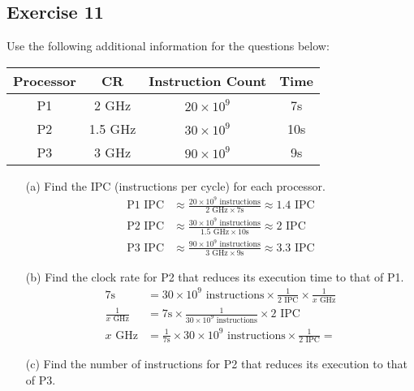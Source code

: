 \documentclass[12pt]{article}
\begin{document}
\subsection*{Exercise 11} Use the following additional information for the questions below:
\begin{center}
\begin{tabular}{| c | c | c | c |}
\hline
Processor & CR & Instruction Count & Time \\
\hline
P1 & 2 GHz & $20 \times 10^9$ & 7s \\
\hline
P2 & 1.5 GHz & $30 \times 10^9$ & 10s \\
\hline
P3 & 3 GHz & $90 \times 10^9$ & 9s \\
\hline
\end{tabular}
\end{center}
\begin{itemize}
\item[(a)] Find the IPC (instructions per cycle) for each processor.
\begin{align*}
\text{P1 IPC} &\approx \frac{20 \times 10^9 \text{ instructions}}{2 \text{ GHz} \times 7\text{s}} \approx 1.4 \text{ IPC} \\
\text{P2 IPC} &\approx \frac{30 \times 10^9 \text{ instructions}}{1.5 \text{ GHz} \times 10\text{s}} \approx 2 \text{ IPC} \\
\text{P3 IPC} &\approx \frac{90 \times 10^9 \text{ instructions}}{3 \text{ GHz} \times 9\text{s}} \approx 3.3 \text{ IPC}
\end{align*}
\item[(b)] Find the clock rate for P2 that reduces its execution time to that of P1.
\begin{align*}
7\text{s} &= 30 \times 10^9 \text{ instructions} \times \frac{1}{2\text{ IPC}} \times \frac{1}{x\text{ GHz}} \\
\frac{1}{x\text{ GHz}} &= 7\text{s} \times \frac{1}{30 \times 10^9\text{ instructions}} \times 2\text{ IPC} \\
x\text{ GHz} &= \frac{1}{7\text{s}} \times 30 \times 10^9\text{ instructions} \times \frac{1}{2\text{ IPC}} = 
\end{align*}
\item[(c)] Find the number of instructions for P2 that reduces its execution to that of P3.
\end{itemize}
\end{document}
